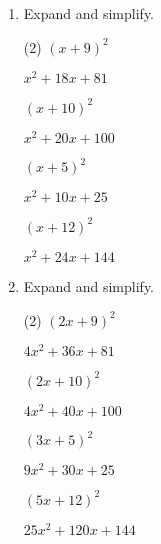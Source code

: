 \begin{enumerate} [leftmargin=0cm] 
\item Expand and simplify.
\begin{tasks}[label=(\alph*), after-item-skip=2pt,after-skip=3pt, label-width=4ex](2)
    \task  $ (x+ 9)^2   $    \\  \begin{envAnswer} $   x^2 +   18x +    81       $ \end{envAnswer}
    \task  $ (x+10)^2   $    \\  \begin{envAnswer} $   x^2 +   20x +   100       $ \end{envAnswer}
    \task  $ (x+ 5)^2   $    \\  \begin{envAnswer} $   x^2 +   10x +    25       $ \end{envAnswer}
    \task  $ (x+12)^2   $    \\  \begin{envAnswer} $   x^2 +   24x +   144       $ \end{envAnswer}
\end{tasks}

\item Expand and simplify.
\begin{tasks}[label=(\alph*), after-item-skip=2pt,after-skip=3pt, label-width=4ex](2)
    \task  $ (2x+ 9)^2  $    \\  \begin{envAnswer} $  4x^2 +   36x +    81       $ \end{envAnswer}
    \task  $ (2x+10)^2  $    \\  \begin{envAnswer} $  4x^2 +   40x +   100       $ \end{envAnswer}
    \task  $ (3x+ 5)^2  $    \\  \begin{envAnswer} $  9x^2 +   30x +    25       $ \end{envAnswer}
    \task  $ (5x+12)^2  $    \\  \begin{envAnswer} $ 25x^2 +  120x +   144       $ \end{envAnswer}
\end{tasks}



\end{enumerate}

